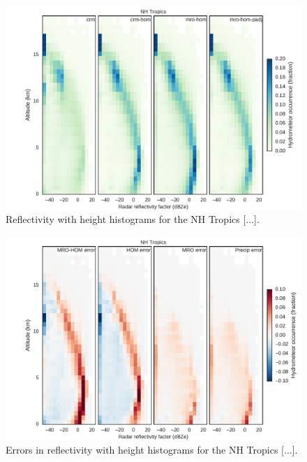 \begin{figure}
\centering
\includegraphics[width=\columnwidth]{graphics/subgrid1_cfadDbze94_NHTropics.pdf}
\caption{Reflectivity with height histograms for the NH Tropics [...].}
\label{sg_cfadDbze94_tropics}
\end{figure}

\begin{figure}
\centering
\includegraphics[width=\columnwidth]{graphics/subgrid1_cfadDbze94_NHTropics_diff.pdf}
\caption{Errors in reflectivity with height histograms for the NH Tropics [...].}
\label{sg_cfadDbze94_tropics_diff}
\end{figure}

